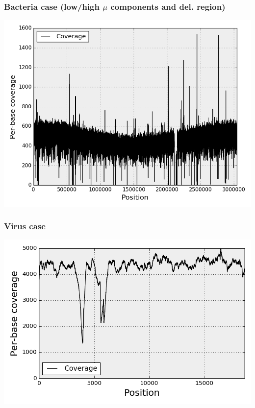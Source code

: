\documentclass{beamer}
\begin{document}
\begin{frame}
\frametitle{\small Bacteria case (low/high $\mu$ components and del. region)}
\begin{center}
\includegraphics[height=0.9\textheight, width=1\textwidth]{images/coverage_bacteria.png}
\end{center}
\end{frame}

\begin{frame}
\frametitle{\small Virus case}
\begin{center}
\includegraphics[height=0.9\textheight, width=1\textwidth]{images/coverage_virus.png}
\end{center}
\end{frame}
\end{document}
